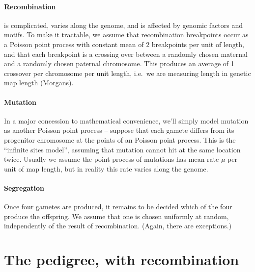 \paragraph{Recombination} is complicated, varies along the genome, and is affected by genomic factors and motifs.
To make it tractable, we assume that recombination breakpoints occur as a Poisson point process 
with constant mean of 2 breakpoints per unit of length,
and that each breakpoint is a crossing over between a randomly chosen maternal and a randomly chosen paternal chromosome.
This produces an average of 1 crossover per chromosome per unit length, 
i.e.\ we are measuring length in genetic map length (Morgans).


\paragraph{Mutation}
In a major concession to mathematical convenience, we'll simply model mutation as another Poisson point process --
suppose that each gamete differs from its progenitor chromosome at the points of an Poisson point process.
This is the ``infinite sites model'', assuming that mutation cannot hit at the same location twice.
Usually we assume the point process of mutations has mean rate $\mu$ per unit of map length,
but in reality this rate varies along the genome.

\paragraph{Segregation}
Once four gametes are produced, it remains to be decided which of the four produce the offspring.
We assume that one is chosen uniformly at random,
independently of the result of recombination.
(Again, there are exceptions.)


\section{The pedigree, with recombination}

